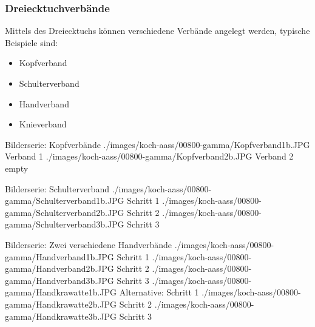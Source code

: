 \subsubsection{Dreiecktuchverbände}

Mittels des Dreiecktuchs können verschiedene Verbände
angelegt werden, typische Beispiele sind:

\begin{itemize}
  \item Kopfverband \dotfill
  \item Schulterverband \dotfill
  \item Handverband \dotfill {}
  \item Knieverband \dotfill {}
\end{itemize}




\begin{PictureSeriesWide}{}{Bilderserie:
Kopfverbände\label{fig:mitella-kopfverband}}
{./images/koch-aass/00800-gamma/Kopfverband1b.JPG}
{Verband 1}
{./images/koch-aass/00800-gamma/Kopfverband2b.JPG}
{Verband 2}
{empty}
{}
{}
{}
\end{PictureSeriesWide}

\begin{PictureSeriesWide}{}{Bilderserie:
Schulterverband\label{fig:mitella-schulterverband}}
{./images/koch-aass/00800-gamma/Schulterverband1b.JPG}
{Schritt 1}
{./images/koch-aass/00800-gamma/Schulterverband2b.JPG}
{Schritt 2}
{./images/koch-aass/00800-gamma/Schulterverband3b.JPG}
{Schritt 3}
{}
{}
\end{PictureSeriesWide}



\begin{PictureSeriesWide}{}{Bilderserie: Zwei verschiedene
Handverbände\label{fig:mitella-handverband}}
{./images/koch-aass/00800-gamma/Handverband1b.JPG}
{Schritt 1}
{./images/koch-aass/00800-gamma/Handverband2b.JPG}
{Schritt 2}
{./images/koch-aass/00800-gamma/Handverband3b.JPG}
{Schritt 3}
{}
{}
{./images/koch-aass/00800-gamma/Handkrawatte1b.JPG}
{Alternative: Schritt 1}
{./images/koch-aass/00800-gamma/Handkrawatte2b.JPG}
{Schritt 2}
{./images/koch-aass/00800-gamma/Handkrawatte3b.JPG}
{Schritt 3}
{}
{}
\end{PictureSeriesWide}

